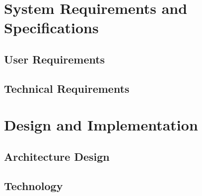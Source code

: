 \documentclass[12pt,a4paper]{article}
\begin{document}
\section{System Requirements and Specifications} \label{section:requirements}



\subsection{User Requirements}


\subsection{Technical Requirements}





%
%
%
%
%
%
%
%
\newpage
\section{Design and Implementation} \label{section:design-implementation}


\subsection{Architecture Design}


\subsection{Technology}
\end{document}
